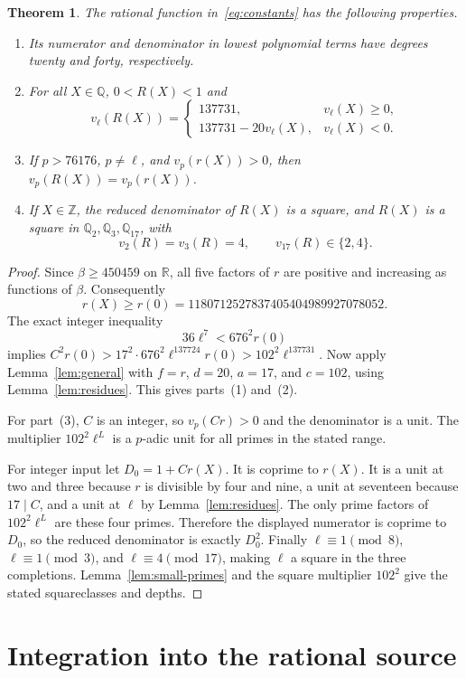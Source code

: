 \documentclass[11pt,a4paper]{article}
\newtheorem{theorem}{Theorem}
\newcommand{\Q}{\mathbb Q}\newcommand{\Z}{\mathbb Z}
\begin{document}
\begin{theorem}\label{thm:explicit}
The rational function in~\eqref{eq:constants} has the following
properties.
\begin{enumerate}
\item Its numerator and denominator in lowest polynomial terms
have degrees twenty and forty, respectively.
\item For all $X\in\Q$, $0<R(X)<1$ and
\[
 v_\ell(R(X))=
 \begin{cases}
 137731,&v_\ell(X)\ge0,\\
 137731-20v_\ell(X),&v_\ell(X)<0.
 \end{cases}
\]
\item If $p>76176$, $p\ne\ell$, and $v_p(r(X))>0$, then
$v_p(R(X))=v_p(r(X))$.
\item If $X\in\Z$, the reduced denominator of $R(X)$ is a
square, and $R(X)$ is a square in $\Q_2,\Q_3,\Q_{17}$, with
\[
 v_2(R)=v_3(R)=4,\qquad v_{17}(R)\in\{2,4\}.
\]
\end{enumerate}
\end{theorem}
\begin{proof}
Since $\beta\ge450459$ on $\mathbb R$, all five factors of
$r$ are positive and increasing as functions of $\beta$.
Consequently
\[
 r(X)\ge r(0)=1180712527837405404989927078052.
\]
The exact integer inequality
\[
 36\ell^7<676^2r(0)
\]
implies
$C^2r(0)>17^2\cdot676^2\ell^{137724}r(0)
>102^2\ell^{137731}$.
Now apply Lemma~\ref{lem:general} with $f=r$, $d=20$,
$a=17$, and $c=102$, using Lemma~\ref{lem:residues}.
This gives parts~(1) and~(2).

For part~(3), $C$ is an integer, so $v_p(Cr)>0$ and the
denominator is a unit. The multiplier $102^2\ell^L$ is a
$p$-adic unit for all primes in the stated range.

For integer input let $D_0=1+Cr(X)$. It is coprime to $r(X)$.
It is a unit at two and three because $r$ is divisible by four
and nine, a unit at seventeen because $17\mid C$, and a unit
at $\ell$ by Lemma~\ref{lem:residues}. The only prime factors
of $102^2\ell^L$ are these four primes. Therefore the displayed
numerator is coprime to $D_0$, so the reduced denominator is
exactly $D_0^2$. Finally
$\ell\equiv1\pmod8$, $\ell\equiv1\pmod3$, and
$\ell\equiv4\pmod{17}$, making $\ell$ a square in the three
completions. Lemma~\ref{lem:small-primes} and the square
multiplier $102^2$ give the stated squareclasses and depths.
\end{proof}

\section{Integration into the rational source}
\end{document}
